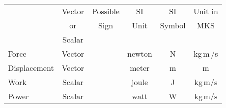 {\begin{two-digit-list}
\begin{tabular}{|l|c|c|c|c|c|}
               & Vector & Possible          & SI   & SI     & Unit in\\
               &  or    &   Sign            & Unit & Symbol & MKS    \\
               & Scalar &                   &      &        &  \\ \hline
Force          & Vector & \m{+,0,-} & newton& N & kg\,m\,/s\up{2} \\ \hline
Displacement   & Vector & \m{+,0,-} & meter & m & m \\ \hline
Work           & Scalar & \m{+,0,-} & joule & J & kg\,m\up{2}/s\up{2} \\ \hline
Power          & Scalar & \m{+,0,-} & watt  & W & kg\,m\up{2}/s\up{3} \\ \hline
\end{tabular}


\end{two-digit-list}}
